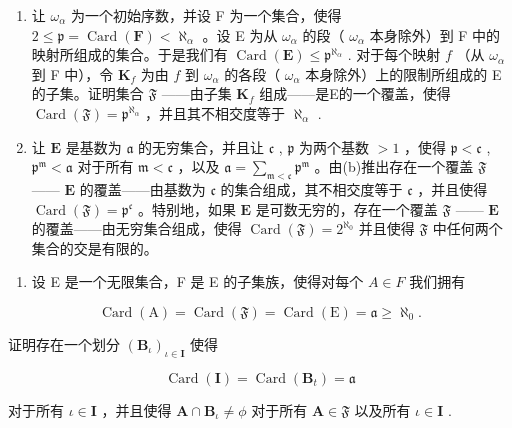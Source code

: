 \begin{enumerate}
\def\labelenumi{(\alph{enumi})}
\setcounter{enumi}{1}
\item
  让 \(\omega_{\alpha}\) 为一个初始序数，并设 F 为一个集合，使得 \(2 \leqslant \mathfrak{p} = \operatorname{Card}(\mathbf{F}) < \aleph_{\alpha}\) 。设 E 为从 \(\omega_{\alpha}\) 的段（ \(\omega_{\alpha}\) 本身除外）到 F 中的映射所组成的集合。于是我们有 \(\operatorname{Card}(\mathbf{E}) \leqslant \mathfrak{p}^{\aleph_{\alpha}}\) . 对于每个映射 \(f\) （从 \(\omega_{\alpha}\) 到 F 中），令 \(\mathbf{K}_f\) 为由 \(f\) 到 \(\omega_{\alpha}\) 的各段（ \(\omega_{\alpha}\) 本身除外）上的限制所组成的 E 的子集。证明集合 \(\mathfrak{F}\) ——由子集 \(\mathbf{K}_f\) 组成——是E的一个覆盖，使得 \(\operatorname{Card}(\mathfrak{F}) = \mathfrak{p}^{\aleph_{\alpha}}\) ，并且其不相交度等于 \(\aleph_{\alpha}\) .
\item
  让 \(\mathbf{E}\) 是基数为 \(\mathfrak{a}\) 的无穷集合，并且让 \(\mathfrak{c}\) , \(\mathfrak{p}\) 为两个基数 \(> 1\) ，使得 \(\mathfrak{p} < \mathfrak{c}\) , \(\mathfrak{p}^{\mathfrak{m}} < \mathfrak{a}\) 对于所有 \(\mathfrak{m} < \mathfrak{c}\) ，以及 \(\mathfrak{a} = \sum_{\mathfrak{m} < \mathfrak{c}} \mathfrak{p}^{\mathfrak{m}}\) 。由(b)推出存在一个覆盖 \(\mathfrak{F}\) —— \(\mathbf{E}\) 的覆盖——由基数为 \(\mathfrak{c}\) 的集合组成，其不相交度等于 \(\mathfrak{c}\) ，并且使得 \(\operatorname{Card}(\mathfrak{F}) = \mathfrak{p}^{\mathfrak{c}}\) 。特别地，如果 \(\mathbf{E}\) 是可数无穷的，存在一个覆盖 \(\mathfrak{F}\) —— \(\mathbf{E}\) 的覆盖——由无穷集合组成，使得 \(\operatorname{Card}(\mathfrak{F}) = 2^{\aleph_0}\) 并且使得 \(\mathfrak{F}\) 中任何两个集合的交是有限的。
\end{enumerate}

\begin{enumerate}
\def\labelenumi{\arabic{enumi}.}
\setcounter{enumi}{25}
\tightlist
\item
  设 E 是一个无限集合，F 是 E 的子集族，使得对每个 \(A \in F\) 我们拥有
\end{enumerate}

\[
\operatorname{Card} (\mathrm{A}) = \operatorname{Card} (\mathfrak {F}) = \operatorname{Card} (\mathrm{E}) = \mathfrak {a} \geqslant \aleph_ {0}.
\]

证明存在一个划分 \((\mathbf{B}_{\iota})_{\iota\in\mathbf{I}}\) 使得

\[
\operatorname{Card} (\mathbf {I}) = \operatorname{Card} \left(\mathbf {B} _ {t}\right) = \mathfrak {a}
\]

对于所有 \(\iota\in\mathbf{I}\) ，并且使得 \(\mathbf{A}\cap\mathbf{B}_{\iota}\neq\phi\) 对于所有 \(\mathbf{A}\in\mathfrak{F}\) 以及所有 \(\iota\in\mathbf{I}\) .


